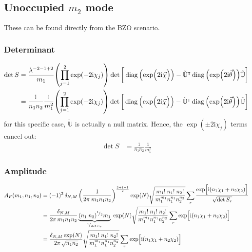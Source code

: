 \documentclass[
	english,
	a4paper,
	fontsize=10pt,
	parskip=half,
	titlepage=true,
	DIV=12,
	final
]{scrreprt}
\newcommand*{\smallfrac}  [2]{\ensuremath{{}^        {#1} \!/_        {#2}}}
\newcommand*{\transp}{\ensuremath{^\intercal}}
\newcommand*{\iunit}{\ensuremath{\mathrm{i}}}
\DeclareMathOperator{\diag}{diag}
\begin{document}
\subsection{Unoccupied $m_2$ mode}
These can be found directly from the BZO scenario.

\subsubsection{Determinant}
\begin{align}
	\det S
&=
	\frac{ \lambda^{-2 - 1 + 2} }{ m_1 }
	\qty( \prod_{j=1}^{2} \exp(-2\iunit \chi_j) )
	\det\qty[\bigg.
		\diag\qty(\exp(\Big.2\iunit\vec{\chi}))
		-
		\tilde{\mathbb{U}}\transp
		\diag\qty(\exp(2\iunit\vec{\theta}))
		\tilde{\mathbb{U}}
	] \\
&=
	\frac{1}{n_1 n_2}
	\frac{1}{m_1^{2}}
	\qty( \prod_{j=1}^{2} \exp(-2\iunit \chi_j) )
	\det\qty[\bigg.
		\diag\qty(\exp(\Big.2\iunit\vec{\chi}))
		-
		\tilde{\mathbb{U}}\transp
		\diag\qty(\exp(2\iunit\vec{\theta}))
		\tilde{\mathbb{U}}
	]
\end{align}
for this specific case, $\tilde{\mathbb{U}}$ is actually a null matrix. Hence, the 
$\exp(\pm 2\iunit \chi_j)$ terms cancel out:
\begin{align}
	\det S
&=
	\frac{1}{n_1 n_2}
	\frac{1}{m_1^{2}}
\end{align}

\subsubsection{Amplitude}
\begin{align}
\nonumber
	A_F(m_1, n_1, n_2)
&=
	(-1)^2
	\, \delta_{N,M} \, \qty(
		\frac{1}{2\pi \; m_1 n_1 n_2}
	)^{\frac{2+1-1}{2}}
	\exp(N)
	\sqrt{\frac
		{ m_1! \; n_1! \; n_2! }
		{ m_1^{m_1} n_1^{n_1} n_2^{n_2} }
	}
	\sum_r
		\frac
		{\exp[ \Big.
			\iunit \qty( 
			n_1 \chi_1 + n_2 \chi_2)
		]}
		{\sqrt{\det S_r}} \\
\nonumber
&=
	\frac
		{\delta_{N,M}}
		{2\pi \, m_1 n_1 n_2}
	\underbrace{
		(n_1 \; n_2)^{\smallfrac{1}{2}} m_1
	}_{\smallfrac{1}{\det S_r}} \;
	\exp(N)
	\sqrt{\frac
		{ m_1! \; n_1! \; n_2! }
		{ m_1^{m_1} n_1^{n_1} n_2^{n_2} }
	}
	\sum_r
		\exp[ \Big.
			\iunit \qty(  
			n_1 \chi_1 + n_2 \chi_2)
		]
	\\
&=
	\frac
		{\delta_{N,M} \exp(N)}
		{2\pi \, \sqrt{n_1 n_2}}
	\sqrt{\frac
		{ m_1! \; n_1! \; n_2! }
		{ m_1^{m_1} n_1^{n_1} n_2^{n_2} }
	}
	\sum_r
		\exp[ \Big.
			\iunit \qty(  
			n_1 \chi_1 + n_2 \chi_2)
		]
\end{align}
\end{document}
